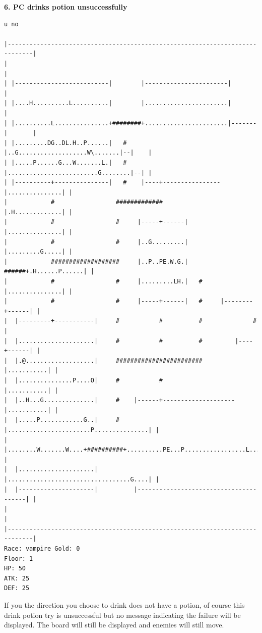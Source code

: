 \documentclass[11pt]{article}
\theoremstyle{plain}
\begin{document}
\newpage
\textbf{6. PC drinks potion unsuccessfully}
\begin{Verbatim}[fontsize=\scriptsize]
u no

|-----------------------------------------------------------------------------|
|                                                                             |
| |--------------------------|        |-----------------------|               |
| |....H..........L..........|        |.......................|               |
| |..........L...............+########+.......................|-------|       |
| |.........DG..DL.H..P......|   #    |..G...................W\.......|--|    |
| |.....P......G...W.......L.|   #    |.........................G........|--| |
| |----------+---------------|   #    |----+----------------|...............| |
|            #                 #############                |.H.............| |
|            #                 #     |-----+------|         |...............| |
|            #                 #     |..G.........|         |.........G.....| |
|            ###################     |..P..PE.W.G.|   ######+.H......P......| |
|            #                 #     |.........LH.|   #     |...............| |
|            #                 #     |-----+------|   #     |--------+------| |
|  |---------+-----------|     #           #          #              #        |
|  |.....................|     #           #          #         |----+------| |
|  |.@...................|     ########################         |...........| |
|  |...............P....O|     #           #                    |...........| |
|  |..H...G..............|     #    |------+--------------------|...........| |
|  |.....P............G..|     #    |.......................P...............| |
|  |........W.......W....+##########+..........PE...P.................L.....| |
|  |.....................|          |..................................G....| |
|  |---------------------|          |---------------------------------------| |
|                                                                             |
|-----------------------------------------------------------------------------|
Race: vampire Gold: 0                                                  Floor: 1
HP: 50
ATK: 25
DEF: 25
\end{Verbatim}

If you the direction you choose to drink does not have a potion, of course
this drink potion try is unsuccessful but no message indicating the failure
will be displayed. The board will still be displayed and enemies will still
move.
\end{document}
